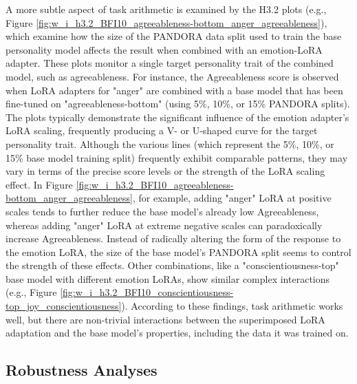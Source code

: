 \documentclass{DESSThesis}
\begin{document}
A more subtle aspect of task arithmetic is examined by the H3.2 plots (e.g., Figure \ref{fig:w_i_h3.2_BFI10_agreeableness-bottom_anger_agreeableness}), which examine how the size of the PANDORA data split used to train the base personality model affects the result when combined with an emotion-LoRA adapter. These plots monitor a single target personality trait of the combined model, such as agreeableness. For instance, the Agreeableness score is observed when LoRA adapters for "anger" are combined with a base model that has been fine-tuned on "agreeableness-bottom" (using 5\%, 10\%, or 15\% PANDORA splits). The plots typically demonstrate the significant influence of the emotion adapter's LoRA scaling, frequently producing a V- or U-shaped curve for the target personality trait. Although the various lines (which represent the 5\%, 10\%, or 15\% base model training split) frequently exhibit comparable patterns, they may vary in terms of the precise score levels or the strength of the LoRA scaling effect. In Figure \ref{fig:w_i_h3.2_BFI10_agreeableness-bottom_anger_agreeableness}, for example, adding "anger" LoRA at positive scales tends to further reduce the base model's already low Agreeableness, whereas adding "anger" LoRA at extreme negative scales can paradoxically increase Agreeableness. Instead of radically altering the form of the response to the emotion LoRA, the size of the base model's PANDORA split seems to control the strength of these effects. Other combinations, like a "conscientiousness-top" base model with different emotion LoRAs, show similar complex interactions (e.g., Figure \ref{fig:w_i_h3.2_BFI10_conscientiousness-top_joy_conscientiousness}). According to these findings, task arithmetic works well, but there are non-trivial interactions between the superimposed LoRA adaptation and the base model's properties, including the data it was trained on.

\subsection{Robustness Analyses}
\end{document}
